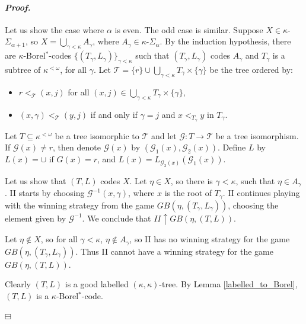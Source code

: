 \documentclass[12pt,a4paper]{amsart}
\theoremstyle{definition}
\theoremstyle{remark}
\newenvironment{cproof}{\paragraph{\emph{Proof.\,}}}{\hfill{$\boxminus$}\par\vspace{2mm}}
\def\borelstar{Borel\nobreak\hspace{1pt}$^*$}
\begin{document}
\begin{cproof}

Let us show the case where $\alpha$ is even. The odd case is similar.
Suppose $X\in \kappa$-$\Sigma_{\alpha+1}$, so $X=\bigcup_{\gamma<\kappa}A_\gamma$, where $A_\gamma\in \kappa$-$\Sigma_\alpha$. By the induction hypothesis, there are $\kappa$-\borelstar-codes $\{(T_\gamma,L_\gamma)\}_{\gamma<\kappa}$ such that $(T_\gamma,L_\gamma)$ codes $A_\gamma$ and $T_\gamma$ is a subtree of $\kappa^{<\omega}$, for all $\gamma$. 
Let $\mathcal{T}=\{r\}\cup\bigcup_{\gamma<\kappa}T_\gamma\times\{\gamma\}$ be the tree ordered by:
\begin{itemize}
    \item $r<_\mathcal{T}(x,j)$ for all $(x,j)\in \bigcup_{\gamma<\kappa}T_\gamma\times\{\gamma\}$,
    \item $(x,\gamma)<_\mathcal{T}(y,j)$ if and only if $\gamma=j$ and $x<_{T_\gamma}y$ in $T_\gamma$.
\end{itemize}

Let $T\subseteq \kappa^{<\omega}$ be a tree isomorphic to $\mathcal{T}$ and let $\mathcal{G}:T\rightarrow \mathcal{T}$ be a tree isomorphism. 
If $\mathcal{G}(x)\neq r$, then denote $\mathcal{G}(x)$ by $(\mathcal{G}_1(x),\mathcal{G}_2(x))$. Define $L$ by $L(x)=\cup$ if $G(x)=r$, and $L(x)=L_{\mathcal{G}_2(x)}(\mathcal{G}_1(x))$. 

Let us show that $(T,L)$ codes $X$. Let $\eta\in X$, so there is $\gamma<\kappa$, such that $\eta\in A_\gamma$. 
II starts by choosing $\mathcal{G}^{-1}(x,\gamma)$, where $x$ is the root of $T_\gamma$. II continues playing with the winning strategy from the game $GB(\eta,(T_\gamma,L_\gamma))$, choosing the element given by $\mathcal{G}^{-1}$. We conclude that $II\uparrow GB(\eta,(T,L))$. 

Let $\eta\not\in X$, so for all $\gamma<\kappa$, $\eta\not\in A_\gamma$, so II has no winning strategy for the game $GB(\eta,(T_\gamma,L_\gamma))$. Thus II cannot have a winning strategy for the game $GB(\eta,(T,L))$.

Clearly $(T,L)$ is a good labelled $(\kappa,\kappa)$-tree. By Lemma \ref{labelled_to_Borel}, $(T,L)$ is a $\kappa$-\borelstar-code.

\end{cproof}
\end{document}
